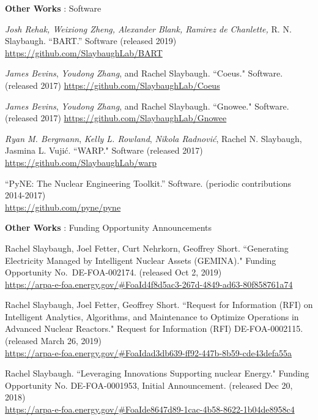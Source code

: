 \begin{bibsection}
\item \textbf{Other Works} : Software
\item \textit{Josh Rehak, Weixiong Zheng, Alexander Blank, Ramirez de Chanlette,} R. N. Slaybaugh. “BART.” Software (released 2019) \\
\url{https://github.com/SlaybaughLab/BART}

\item \textit{James Bevins}, \textit{Youdong Zhang}, and Rachel Slaybaugh. ``Coeus." Software. (released 2017) \url{https://github.com/SlaybaughLab/Coeus} 

\item \textit{James Bevins}, \textit{Youdong Zhang}, and Rachel Slaybaugh. ``Gnowee." Software. (released 2017) \url{https://github.com/SlaybaughLab/Gnowee} 

\item \textit{Ryan M. Bergmann}, \textit{Kelly L. Rowland}, \textit{Nikola Radnovi\'c}, Rachel N. Slaybaugh, Jasmina L. Vuji\'c. ``WARP." Software (released 2017) \url{https://github.com/SlaybaughLab/warp}

\item “PyNE: The Nuclear Engineering Toolkit.” Software. (periodic contributions 2014-2017) \\
\url{https://github.com/pyne/pyne}

\item \textbf{Other Works} : Funding Opportunity Announcements
\item Rachel Slaybaugh, Joel Fetter, Curt Nehrkorn, Geoffrey Short. ``Generating Electricity Managed by Intelligent Nuclear
Assets (GEMINA)." Funding Opportunity No.\ DE-FOA-002174. (released Oct 2, 2019)\\
\url{https://arpa-e-foa.energy.gov/#FoaId4f8d5ac3-267d-4849-ad63-80f858761a74}

\item Rachel Slaybaugh, Joel Fetter, Geoffrey Short. ``Request for Information (RFI) on Intelligent Analytics, Algorithms, and Maintenance to Optimize Operations in Advanced Nuclear Reactors." Request for Information (RFI) DE-FOA-0002115. (released March 26, 2019)\\
\url{https://arpa-e-foa.energy.gov/#FoaIdad3db639-ff92-447b-8b59-cde43defa55a}

\item Rachel Slaybaugh. ``Leveraging Innovations Supporting nuclear Energy." Funding Opportunity No. DE-FOA-0001953, Initial Announcement. (released Dec 20, 2018)\\
\url{https://arpa-e-foa.energy.gov/#FoaIde8647d89-1cac-4b58-8622-1b04de8958c4}


\end{bibsection}
